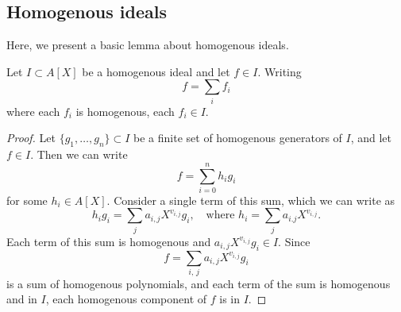 \subsection{Homogenous ideals}

Here, we present a basic lemma about homogenous ideals.

\begin{lemma}\label{lem:homo_components}
  Let $I \subset A[X]$ be a homogenous ideal and let $f \in I$. Writing
  \[f = \sum_{i} f_{i}\]
  where each $f_{i}$ is homogenous, each $f_{i} \in I$.
\end{lemma}
\begin{proof}
  Let $\{g_{1}, \dots, g_{n}\} \subset I$ be a finite set of homogenous generators of $I$, and let $f \in I$. Then we can write
  \[f = \sum_{i=0}^{n} h_{i} g_{i}\]
  for some $h_{i} \in A[X]$. Consider a single term of this sum, which we can write as
  \[h_{i} g_{i} = \sum_{j} a_{i,j}X^{v_{i,j}} g_{i}, \quad \text{where } h_{i} = \sum_{j} a_{i.j}X^{v_{i,j}}.\]
  Each term of this sum is homogenous and $a_{i,j} X^{v_{i,j}} g_{i} \in I$. Since
  \[f = \sum_{i,\,j} a_{i,j} X^{v_{i, j}} g_{i}\]
  is a sum of homogenous polynomials, and each term of the sum is homogenous and in $I$, each homogenous component of $f$ is in $I$.
\end{proof}

